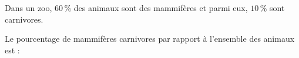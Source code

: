 
Dans un zoo, $60\,\%$ des animaux sont des mammifères et parmi eux, $10\,\%$ sont carnivores.

Le pourcentage de mammifères carnivores par rapport à l'ensemble des animaux est :

\smallskip
{}
